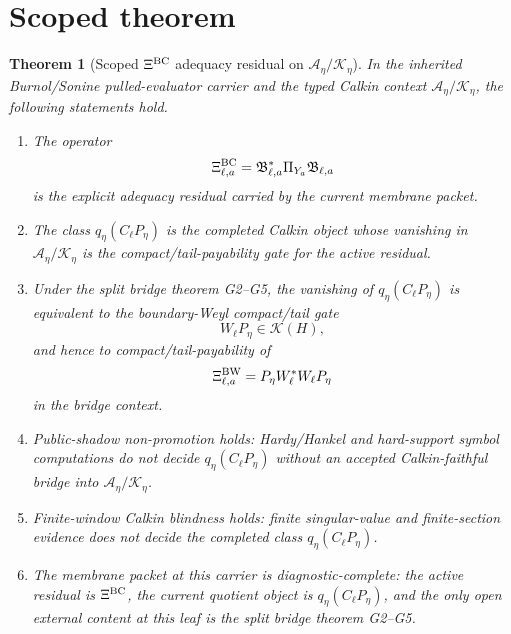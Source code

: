 \documentclass[11pt]{article}
\newtheorem{theorem}{Theorem}
\begin{document}
\section{Scoped theorem}

\begin{theorem}[Scoped \(\Xi^{\rm BC}\) adequacy residual on \(\mathcal A_\eta/\mathcal K_\eta\)]
In the inherited Burnol/Sonine pulled-evaluator carrier and the typed Calkin
context \(\mathcal A_\eta/\mathcal K_\eta\), the following statements hold.
\begin{enumerate}[label=(\roman*)]
\item The operator
\[
  \Xi^{\rm BC}_{\ell,a}
  =
  \mathfrak B_{\ell,a}^{*}\Pi_{Y_a}\mathfrak B_{\ell,a}
\]
is the explicit adequacy residual carried by the current membrane packet.

\item The class \(q_\eta(C_\ell P_\eta)\) is the completed Calkin object whose
vanishing in \(\mathcal A_\eta/\mathcal K_\eta\) is the compact/tail-payability
gate for the active residual.

\item Under the split bridge theorem G2--G5, the vanishing of
\(q_\eta(C_\ell P_\eta)\) is equivalent to the boundary-Weyl compact/tail gate
\[
  W_\ell P_\eta\in\mathcal K(H),
\]
and hence to compact/tail-payability of
\[
  \Xi^{\rm BW}_{\ell,a}=P_\eta W_\ell^*W_\ell P_\eta
\]
in the bridge context.

\item Public-shadow non-promotion holds: Hardy/Hankel and hard-support symbol
computations do not decide \(q_\eta(C_\ell P_\eta)\) without an accepted
Calkin-faithful bridge into \(\mathcal A_\eta/\mathcal K_\eta\).

\item Finite-window Calkin blindness holds: finite singular-value and
finite-section evidence does not decide the completed class
\(q_\eta(C_\ell P_\eta)\).

\item The membrane packet at this carrier is diagnostic-complete: the active
residual is \(\Xi^{\rm BC}\), the current quotient object is
\(q_\eta(C_\ell P_\eta)\), and the only open external content at this leaf is
the split bridge theorem G2--G5.
\end{enumerate}
\end{theorem}
\end{document}
